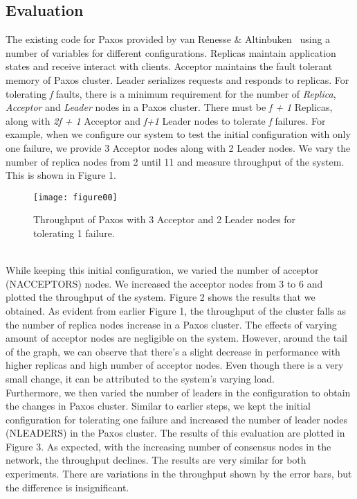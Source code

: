 \documentclass[conference]{IEEEtran}
\begin{document}
\subsection{Evaluation}
The existing code for Paxos provided by van Renesse \& Altinbuken~\cite{b3} using a number of variables for different configurations. 
Replicas maintain application states and receive interact with clients. 
Acceptor maintains the fault tolerant memory of Paxos cluster. 
Leader serializes requests and responds to replicas. 
For tolerating \textit{f} faults, there is a minimum requirement for the number of \textit{Replica}, \textit{Acceptor} and \textit{Leader} nodes in a Paxos cluster. 
There must be \textit{f + 1} Replicas, along with \textit{2f + 1} Acceptor and \textit{f+1} Leader nodes to tolerate \textit{f} failures. 
For example, when we configure our system to test the initial configuration with only one failure, we provide 3 Acceptor nodes along with 2 Leader nodes. 
We vary the number of replica nodes from 2 until 11 and measure throughput of the system. 
This is shown in Figure 1. 
\begin{figure}
	\centering
	\label{initial}
	\texttt{[image: figure00]}
	\caption{Throughput of Paxos with 3 Acceptor and 2 Leader nodes for tolerating 1 failure.}
\end{figure}
\\

While keeping this initial configuration, we varied the number of acceptor (NACCEPTORS) nodes. 
We increased the acceptor nodes from 3 to 6 and plotted the throughput of the system. 
Figure 2 shows the results that we obtained. 
As evident from earlier Figure 1, the throughput of the cluster falls as the number of replica nodes increase in a Paxos cluster.
The effects of varying amount of acceptor nodes are negligible on the system. 
However, around the tail of the graph, we can observe that there's a slight decrease in performance with higher replicas and high number of acceptor nodes. 
Even though there is a very small change, it can be attributed to the system's varying load. 
\\

Furthermore, we then varied the number of leaders in the configuration to obtain the changes in Paxos cluster. 
Similar to earlier steps, we kept the initial configuration for tolerating one failure and increased the number of leader nodes (NLEADERS) in the Paxos cluster. 
The results of this evaluation are plotted in Figure 3. 
As expected, with the increasing number of consensus nodes in the network, the throughput declines. 
The results are very similar for both experiments. 
There are variations in the throughput shown by the error bars, but the difference is insignificant. 
\\
\end{document}

